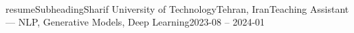 \\resumeSubheading{Sharif University of Technology}{Tehran, Iran}{Teaching Assistant — NLP, Generative Models, Deep Learning}{2023-08 -- 2024-01}
